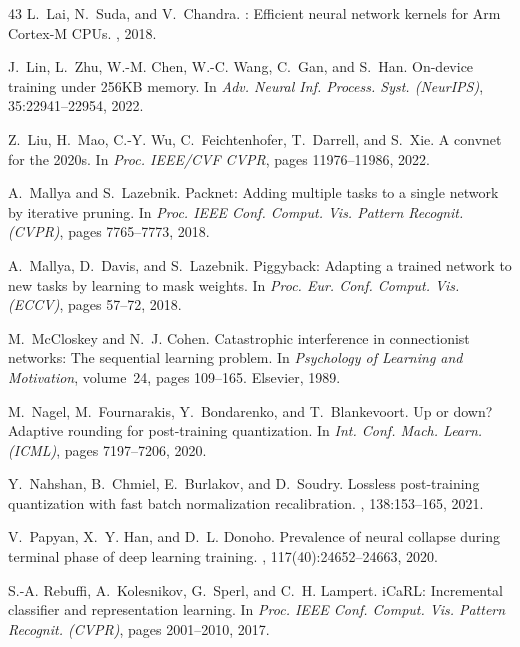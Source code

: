 \documentclass{article}
\begin{document}
\begin{thebibliography}{43}
L.~Lai, N.~Suda, and V.~Chandra.
: Efficient neural network kernels for {Arm Cortex-M} {CPUs}.
, 2018.

J.~Lin, L.~Zhu, W.-M. Chen, W.-C. Wang, C.~Gan, and S.~Han.
\newblock On-device training under 256{KB} memory.
\newblock In {\em Adv. Neural Inf. Process. Syst. (NeurIPS)}, 35:22941--22954, 2022.

Z.~Liu, H.~Mao, C.-Y. Wu, C.~Feichtenhofer, T.~Darrell, and S.~Xie.
\newblock A convnet for the 2020s.
\newblock In {\em Proc. IEEE/CVF CVPR}, pages 11976--11986, 2022.

A.~Mallya and S.~Lazebnik.
\newblock Packnet: Adding multiple tasks to a single network by iterative pruning.
\newblock In {\em Proc. IEEE Conf. Comput. Vis. Pattern Recognit. (CVPR)}, pages 7765--7773, 2018.

A.~Mallya, D.~Davis, and S.~Lazebnik.
\newblock Piggyback: Adapting a trained network to new tasks by learning to mask weights.
\newblock In {\em Proc. Eur. Conf. Comput. Vis. (ECCV)}, pages 57--72, 2018.

M.~McCloskey and N.~J. Cohen.
\newblock Catastrophic interference in connectionist networks: The sequential learning problem.
\newblock In {\em Psychology of Learning and Motivation}, volume~24, pages 109--165. Elsevier, 1989.

M.~Nagel, M.~Fournarakis, Y.~Bondarenko, and T.~Blankevoort.
\newblock Up or down? {A}daptive rounding for post-training quantization.
\newblock In {\em Int. Conf. Mach. Learn. (ICML)}, pages 7197--7206, 2020.

Y.~Nahshan, B.~Chmiel, E.~Burlakov, and D.~Soudry.
\newblock Lossless post-training quantization with fast batch normalization recalibration.
, 138:153--165, 2021.

V.~Papyan, X.~Y. Han, and D.~L. Donoho.
\newblock Prevalence of neural collapse during terminal phase of deep learning training.
, 117(40):24652--24663, 2020.

S.-A. Rebuffi, A.~Kolesnikov, G.~Sperl, and C.~H. Lampert.
\newblock i{C}a{RL}: Incremental classifier and representation learning.
\newblock In {\em Proc. IEEE Conf. Comput. Vis. Pattern Recognit. (CVPR)}, pages 2001--2010, 2017.


\end{thebibliography}
\end{document}
